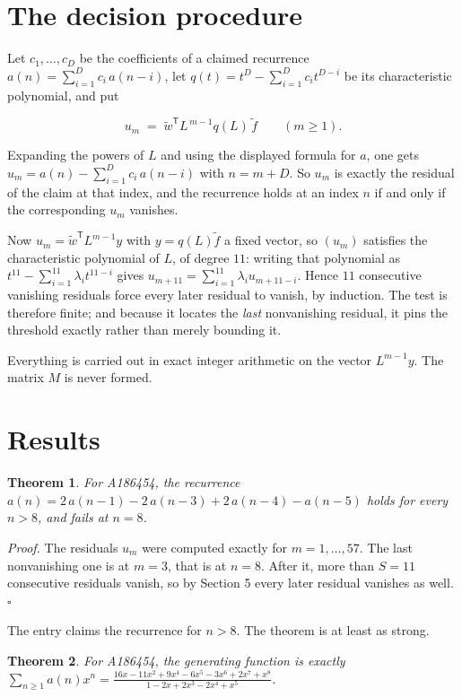 \documentclass[11pt]{article}
\newtheorem{theorem}{Theorem}
\theoremstyle{definition}
\begin{document}
\section{The decision procedure}

Let $c_1,\dots,c_D$ be the coefficients of a claimed recurrence $a(n) = \sum_{i=1}^{D} c_i\,a(n-i)$, let $q(t) = t^{D} - \sum_{i=1}^{D} c_i t^{D-i}$ be its characteristic polynomial, and put

\[u_m \;=\; \tilde w^{\mathsf T} L^{\,m-1} q(L)\,\tilde f \qquad (m \ge 1).\]

Expanding the powers of $L$ and using the displayed formula for $a$, one gets $u_m = a(n) - \sum_{i=1}^{D} c_i\,a(n-i)$ with $n = m + D$. So $u_m$ is exactly the residual of the claim at that index, and the recurrence holds at an index $n$ if and only if the corresponding $u_m$ vanishes.

Now $u_m = \tilde w^{\mathsf T} L^{m-1} y$ with $y = q(L)\tilde f$ a fixed vector, so $(u_m)$ satisfies the characteristic polynomial of $L$, of degree $11$: writing that polynomial as $t^{11} - \sum_{i=1}^{11} \lambda_i t^{11-i}$ gives $u_{m+11} = \sum_{i=1}^{11} \lambda_i u_{m+11-i}$. Hence $11$ consecutive vanishing residuals force every later residual to vanish, by induction. The test is therefore finite; and because it locates the {\itshape last} nonvanishing residual, it pins the threshold exactly rather than merely bounding it.

Everything is carried out in exact integer arithmetic on the vector $L^{m-1}y$. The matrix $M$ is never formed.

\section{Results}

\begin{theorem} For A186454, the recurrence $a(n) = 2\,a(n-1) - 2\,a(n-3) + 2\,a(n-4) - a(n-5)$ holds for every $n > 8$, and fails at $n = 8$.\end{theorem}

{\itshape Proof.} The residuals $u_m$ were computed exactly for $m = 1,\dots,57$. The last nonvanishing one is at $m = 3$, that is at $n = 8$. After it, more than $S = 11$ consecutive residuals vanish, so by Section 5 every later residual vanishes as well. $\square$

The entry claims the recurrence for $n > 8$. The theorem is at least as strong.

\begin{theorem} For A186454, the generating function is exactly $\sum_{n\ge 1} a(n)x^n = \frac{16x - 11x^{2} + 9x^{4} - 6x^{5} - 3x^{6} + 2x^{7} + x^{8}}{1 - 2x + 2x^{3} - 2x^{4} + x^{5}}$.\end{theorem}
\end{document}
